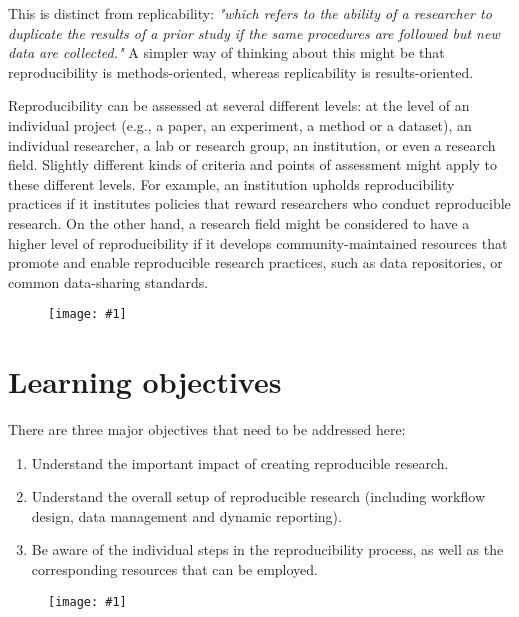 \documentclass{article}
\newlength{\imgwidth}
\newcommand\scaledgraphics[2]{%
                
\settowidth{\imgwidth}{\texttt{[image: \#1]}}%
                
\setlength{\imgwidth}{\minof{\imgwidth}{#2\textwidth}}%
                
\texttt{[image: \#1]}%
                
}
\begin{document}
This is distinct from replicability: \emph{"which refers to the ability of a researcher to duplicate the results of a prior study if the same procedures are followed but new data are collected."} A simpler way of thinking about this might be that reproducibility is methods-oriented, whereas replicability is results-oriented.


Reproducibility can be assessed at several different levels: at the level of an individual project (e.g., a paper, an experiment, a method or a dataset), an individual researcher, a lab or research group, an institution, or even a research field. Slightly different kinds of criteria and points of assessment might apply to these different levels. For example, an institution upholds reproducibility practices if it institutes policies that reward researchers who conduct reproducible research. On the other hand, a research field might be considered to have a higher level of reproducibility if it develops community-maintained resources that promote and enable reproducible research practices, such as data repositories, or common data-sharing standards.

\begin{figure}
\scaledgraphics{9209bd39-910a-46c7-a66a-21a7bbfcd5f7.png}{1}
\label{F32455591}
\end{figure}


\section{Learning objectives}\label{learning-objectives}



There are three major objectives that need to be addressed here:

\begin{enumerate}
\item Understand the important impact of creating reproducible research.


\item Understand the overall setup of reproducible research (including workflow design, data management and dynamic reporting).


\item Be aware of the individual steps in the reproducibility process, as well as the corresponding resources that can be employed.


\end{enumerate}
\begin{figure}
\scaledgraphics{27d237d8-8f65-4eb1-9c68-f087921c61b9.png}{1}
\label{F15419331}
\end{figure}
\end{document}
